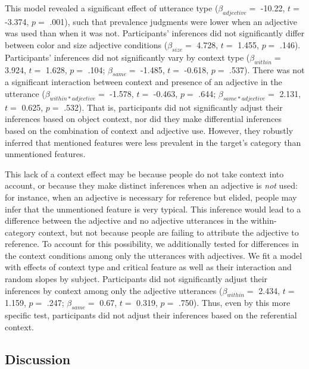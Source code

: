 \documentclass{ucetd}
\begin{document}
This model revealed a significant effect of utterance type
(\(\beta_{adjective} =\) -10.22, \(t =\) -3.374, \(p =\) .001), such
that prevalence judgments were lower when an adjective was used than
when it was not. Participants' inferences did not significantly differ
between color and size adjective conditions (\(\beta_{size} =\) 4.728,
\(t =\) 1.455, \(p =\) .146). Participants' inferences did not
significantly vary by context type (\(\beta_{within} =\) 3.924, \(t =\)
1.628, \(p =\) .104; \(\beta_{same} =\) -1.485, \(t =\) -0.618, \(p =\)
.537). There was not a significant interaction between context and
presence of an adjective in the utterance
(\(\beta_{within*adjective} =\) -1.578, \(t =\) -0.463, \(p =\) .644;
\(\beta_{same*adjective} =\) 2.131, \(t =\) 0.625, \(p =\) .532). That
is, participants did not significantly adjust their inferences based on
object context, nor did they make differential inferences based on the
combination of context and adjective use. However, they robustly
inferred that mentioned features were less prevalent in the target's
category than unmentioned features.

This lack of a context effect may be because people do not take context
into account, or because they make distinct inferences when an adjective
is \emph{not} used: for instance, when an adjective is necessary for
reference but elided, people may infer that the unmentioned feature is
very typical. This inference would lead to a difference between the
adjective and no adjective utterances in the within-category context,
but not because people are failing to attribute the adjective to
reference. To account for this possibility, we additionally tested for
differences in the context conditions among only the utterances with
adjectives. We fit a model with effects of context type and critical
feature as well as their interaction and random slopes by subject.
Participants did not significantly adjust their inferences by context
among only the adjective utterances (\(\beta_{within} =\) 2.434, \(t =\)
1.159, \(p =\) .247; \(\beta_{same} =\) 0.67, \(t =\) 0.319, \(p =\)
.750). Thus, even by this more specific test, participants did not
adjust their inferences based on the referential context.

\hypertarget{discussion-1}{%
\subsection{Discussion}\label{discussion-1}}
\end{document}
